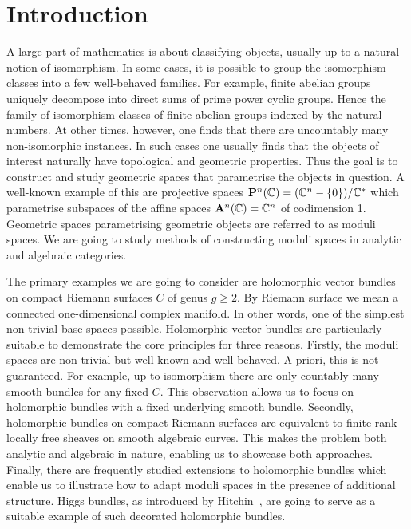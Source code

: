 \documentclass[12pt]{ociamthesis}  %
\begin{document}
\begin{romanpages}          %
  \tableofcontents            %
\end{romanpages}            %

\chapter{Introduction}

A large part of mathematics is about classifying objects, usually
up to a natural notion of isomorphism. In some cases,
it is possible to group the isomorphism classes into a few well-behaved
families. For example, finite abelian groups uniquely decompose
into direct sums of prime power cyclic groups. Hence the family of
isomorphism classes of finite abelian groups indexed by the natural
numbers.  At other times, however, one finds that there are uncountably
many non-isomorphic instances. In such cases one usually finds that
the objects of interest naturally have topological and geometric 
properties. Thus the goal is to construct and study geometric spaces
that parametrise the objects in question. A well-known example
of this are projective spaces
$\mathbf{P}^{n}_{}(\mathbb C) = (\mathbb C^n - \{0\})/\mathbb C^*$
which parametrise subspaces of the affine spaces $\mathbf{A}^{n}_{}(\mathbb C) = \mathbb C^n$
of codimension 1. Geometric
spaces parametrising geometric objects are referred to as moduli spaces.
We are going to study methods of constructing
moduli spaces in analytic and algebraic categories.

The primary examples we are going to consider are holomorphic
vector bundles on compact Riemann surfaces $C$ of genus $g\geq 2$. By Riemann surface
we mean a connected one-dimensional complex manifold. In other words,
one of the simplest non-trivial base spaces possible. Holomorphic vector
bundles are particularly suitable to demonstrate the core principles
for three reasons. Firstly, the moduli spaces are non-trivial but
well-known and well-behaved. A priori, this is not guaranteed. For example, up to isomorphism there are only countably
many smooth bundles for any fixed $C$. This observation allows us to
focus on holomorphic bundles with a fixed underlying smooth bundle.
Secondly, holomorphic bundles on compact Riemann surfaces are equivalent
to finite rank locally free sheaves on smooth algebraic curves. This
makes the problem both analytic and algebraic in nature, enabling
us to showcase both approaches.
Finally, there are frequently studied extensions to holomorphic
bundles which enable us to illustrate how to adapt moduli spaces in the
presence of additional structure. Higgs bundles, as introduced by
Hitchin~\cite{hitchin1987}, are going to serve as a suitable example
of such decorated holomorphic bundles.
\end{document}
